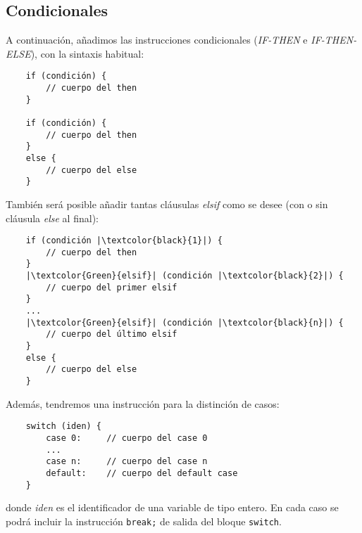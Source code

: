 \documentclass[10pt a4paper]{article}
\newcommand{\code}[1]{\colorbox{light-gray}{\texttt{#1}}}
\numberwithin{equation}{section}
\begin{document}
\subsection{Condicionales}
A continuación, añadimos las instrucciones condicionales (\textit{IF-THEN} e \textit{IF-THEN-ELSE}), con la sintaxis habitual:
\begin{verbatim}
    if (condición) {
        // cuerpo del then
    }

    if (condición) {
        // cuerpo del then
    }
    else {
        // cuerpo del else
    }
\end{verbatim}
También será posible añadir tantas cláusulas \textit{elsif} como se desee (con o sin cláusula \textit{else} al final):
\begin{verbatim}
    if (condición |\textcolor{black}{1}|) {
        // cuerpo del then
    }
    |\textcolor{Green}{elsif}| (condición |\textcolor{black}{2}|) {
        // cuerpo del primer elsif
    }
    ...
    |\textcolor{Green}{elsif}| (condición |\textcolor{black}{n}|) {
        // cuerpo del último elsif
    }
    else {
        // cuerpo del else
    }
\end{verbatim}
Además, tendremos una instrucción para la distinción de casos:
\begin{verbatim}
    switch (iden) {
        case 0:     // cuerpo del case 0
        ...
        case n:     // cuerpo del case n
        default:    // cuerpo del default case
    }
\end{verbatim}
donde \textit{iden} es el identificador de una variable de tipo entero. En cada caso se podrá incluir la instrucción \code{break;} de salida del bloque \code{switch}.
\newline
\end{document}
